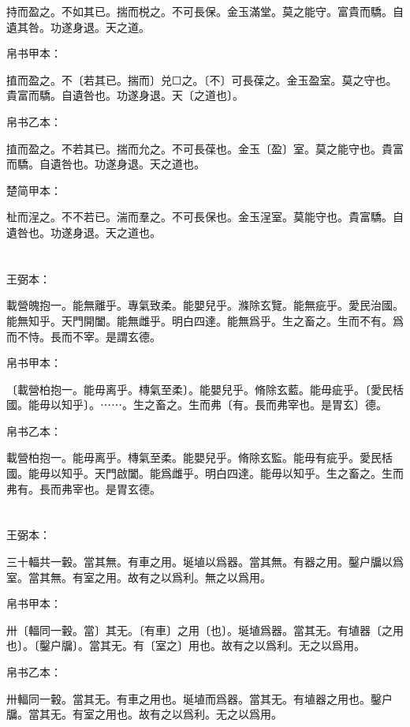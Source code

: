 \documentclass[a5paper]{ctexbook}
\begin{document}
    持而盈之。不如其已。揣而棁之。不可長保。金玉滿堂。莫之能守。富貴而驕。自遺其咎。功遂身退。天之道。

    
    帛书甲本：

    㨁而盈之。不〔若其已。揣而〕兑☐之。〔不〕可長葆之。金玉盈室。莫之守也。貴富而驕。自遺咎也。功遂身退。天〔之道也〕。

    帛书乙本：

    㨁而盈之。不若其已。揣而允之。不可長葆也。金玉〔盈〕室。莫之能守也。貴富而驕。自遺咎也。功遂身退。天之道也。

    楚简甲本：

    杫而浧之。不不若已。湍而羣之。不可長保也。金玉浧室。莫能守也。貴富驕。自遺咎也。功遂身退。天之道也。

    \chapter{}
    王弼本：

    載營魄抱一。能無離乎。專氣致柔。能嬰兒乎。滌除玄覽。能無疵乎。愛民治國。能無知乎。天門開闔。能無雌乎。明白四達。能無爲乎。生之畜之。生而不有。爲而不恃。長而不宰。是謂玄德。

    
    帛书甲本：

    〔載營柏抱一。能毋离乎。槫氣至柔〕。能嬰兒乎。脩除玄藍。能毋疵乎。〔愛民栝國。能毋以知乎〕。⋯⋯。生之畜之。生而弗〔有。長而弗宰也。是胃玄〕德。

    帛书乙本：

    載營柏抱一。能毋离乎。槫氣至柔。能嬰兒乎。脩除玄監。能毋有疵乎。愛民栝國。能毋以知乎。天門啟闔。能爲雌乎。明白四達。能毋以知乎。生之畜之。生而弗有。長而弗宰也。是胃玄德。

    \chapter{}
    王弼本：

    三十輻共一轂。當其無。有車之用。埏埴以爲器。當其無。有器之用。鑿户牖以爲室。當其無。有室之用。故有之以爲利。無之以爲用。

    
    帛书甲本：

    卅〔輻同一轂。當〕其无。〔有車〕之用〔也〕。埏埴爲器。當其无。有埴器〔之用也〕。〔鑿户牖〕。當其无。有〔室之〕用也。故有之以爲利。无之以爲用。

    帛书乙本：

    卅輻同一轂。當其无。有車之用也。埏埴而爲器。當其无。有埴器之用也。鑿户牖。當其无。有室之用也。故有之以爲利。无之以爲用。
\end{document}

